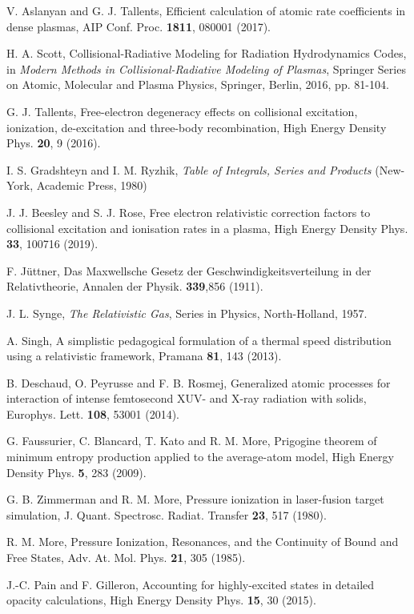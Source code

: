 \documentclass[a4paper,10pt]{article}
\begin{document}
\begin{thebibliography}{99}
V. Aslanyan and G. J. Tallents, Efficient calculation of atomic rate coefficients in dense plasmas, AIP Conf. Proc. {\bf 1811}, 080001 (2017).

H. A. Scott, Collisional-Radiative Modeling for Radiation Hydrodynamics Codes, in {\it Modern Methods in Collisional-Radiative Modeling of Plasmas}, Springer Series on Atomic, Molecular and Plasma Physics, Springer, Berlin, 2016, pp. 81-104.

G. J. Tallents, Free-electron degeneracy effects on collisional excitation, ionization, de-excitation and three-body recombination, High Energy Density Phys. {\bf 20}, 9 (2016).

I. S. Gradshteyn and I. M. Ryzhik, {\it Table of Integrals, Series and Products} (New-York, Academic Press, 1980)

J. J. Beesley and S. J. Rose, Free electron relativistic correction factors to collisional excitation and ionisation rates in a plasma, High Energy Density Phys. {\bf 33}, 100716 (2019).

F. J\"uttner, Das Maxwellsche Gesetz der Geschwindigkeitsverteilung in der Relativtheorie, Annalen der Physik. {\bf 339},856 (1911).

J. L. Synge, {\it The Relativistic Gas}, Series in Physics, North-Holland, 1957.

 A. Singh, A simplistic pedagogical formulation of a thermal speed distribution using a relativistic framework, Pramana {\bf 81}, 143 (2013).

B. Deschaud, O. Peyrusse and F. B. Rosmej, Generalized atomic processes for interaction of intense femtosecond XUV- and X-ray radiation with solids, Europhys. Lett. {\bf 108}, 53001 (2014).

G. Faussurier, C. Blancard, T. Kato and R. M. More, Prigogine theorem of minimum entropy production applied to the average-atom model, High Energy Density Phys. {\bf 5}, 283 (2009).

 G. B. Zimmerman and R. M. More, Pressure ionization in laser-fusion target simulation, J. Quant. Spectrosc. Radiat. Transfer {\bf 23}, 517 (1980).

 R. M. More, Pressure Ionization, Resonances, and the Continuity of Bound and Free States, Adv. At. Mol. Phys. {\bf 21}, 305 (1985).

J.-C. Pain and F. Gilleron, Accounting for highly-excited states in detailed opacity calculations, High Energy Density Phys. {\bf 15}, 30 (2015).

\end{thebibliography}
\end{document}
